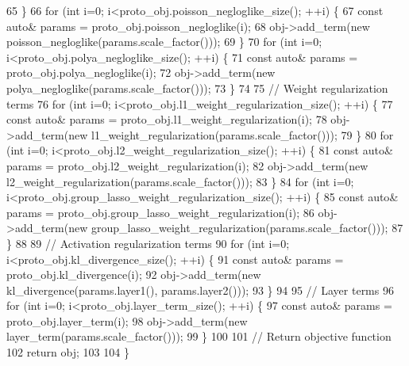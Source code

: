 \begin{DoxyCode}
65   \}
66   \textcolor{keywordflow}{for} (\textcolor{keywordtype}{int} i=0; i<proto\_obj.poisson\_negloglike\_size(); ++i) \{
67     \textcolor{keyword}{const} \textcolor{keyword}{auto}& params = proto\_obj.poisson\_negloglike(i);
68     obj->add\_term(\textcolor{keyword}{new} poisson\_negloglike(params.scale\_factor()));
69   \}
70   \textcolor{keywordflow}{for} (\textcolor{keywordtype}{int} i=0; i<proto\_obj.polya\_negloglike\_size(); ++i) \{
71     \textcolor{keyword}{const} \textcolor{keyword}{auto}& params = proto\_obj.polya\_negloglike(i);
72     obj->add\_term(\textcolor{keyword}{new} polya\_negloglike(params.scale\_factor()));
73   \}
74 
75   \textcolor{comment}{// Weight regularization terms}
76   \textcolor{keywordflow}{for} (\textcolor{keywordtype}{int} i=0; i<proto\_obj.l1\_weight\_regularization\_size(); ++i) \{
77     \textcolor{keyword}{const} \textcolor{keyword}{auto}& params = proto\_obj.l1\_weight\_regularization(i);
78     obj->add\_term(\textcolor{keyword}{new} l1\_weight\_regularization(params.scale\_factor()));
79   \}
80   \textcolor{keywordflow}{for} (\textcolor{keywordtype}{int} i=0; i<proto\_obj.l2\_weight\_regularization\_size(); ++i) \{
81     \textcolor{keyword}{const} \textcolor{keyword}{auto}& params = proto\_obj.l2\_weight\_regularization(i);
82     obj->add\_term(\textcolor{keyword}{new} l2\_weight\_regularization(params.scale\_factor()));
83   \}
84   \textcolor{keywordflow}{for} (\textcolor{keywordtype}{int} i=0; i<proto\_obj.group\_lasso\_weight\_regularization\_size(); ++i) \{
85     \textcolor{keyword}{const} \textcolor{keyword}{auto}& params = proto\_obj.group\_lasso\_weight\_regularization(i);
86     obj->add\_term(\textcolor{keyword}{new} group\_lasso\_weight\_regularization(params.scale\_factor()));
87   \}
88 
89   \textcolor{comment}{// Activation regularization terms}
90   \textcolor{keywordflow}{for} (\textcolor{keywordtype}{int} i=0; i<proto\_obj.kl\_divergence\_size(); ++i) \{
91     \textcolor{keyword}{const} \textcolor{keyword}{auto}& params = proto\_obj.kl\_divergence(i);
92     obj->add\_term(\textcolor{keyword}{new} kl\_divergence(params.layer1(), params.layer2()));
93   \}
94 
95   \textcolor{comment}{// Layer terms}
96   \textcolor{keywordflow}{for} (\textcolor{keywordtype}{int} i=0; i<proto\_obj.layer\_term\_size(); ++i) \{
97     \textcolor{keyword}{const} \textcolor{keyword}{auto}& params = proto\_obj.layer\_term(i);
98     obj->add\_term(\textcolor{keyword}{new} layer\_term(params.scale\_factor()));
99   \}
100 
101   \textcolor{comment}{// Return objective function}
102   \textcolor{keywordflow}{return} obj;
103 
104 \}
\end{DoxyCode}
